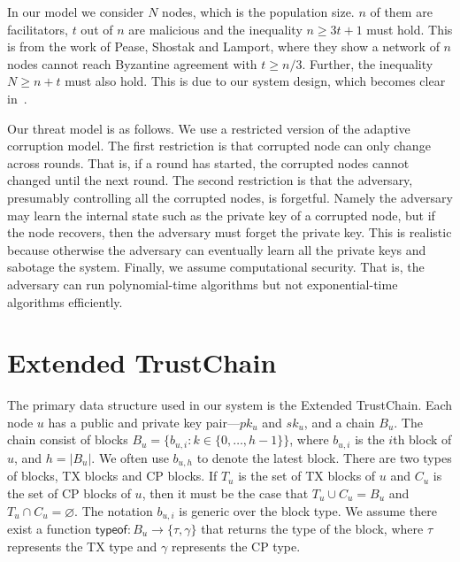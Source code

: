 In our model we consider $N$ nodes, which is the population size.
$n$ of them are facilitators, $t$ out of $n$ are malicious and the inequality
$n \ge 3t + 1$ must hold.
This is from the work of Pease, Shostak and Lamport, where they show a network of $n$ nodes cannot reach Byzantine agreement with $t \ge n/3$.
Further, the inequality $N \ge n + t$ must also hold.
This is due to our system design, which becomes clear in~.

Our threat model is as follows. 
We use a restricted version of the adaptive corruption model.
The first restriction is that corrupted node can only change across rounds.
That is, if a round has started, the corrupted nodes cannot changed until the next round.
The second restriction is that the adversary, presumably controlling all the corrupted nodes, is forgetful.
Namely the adversary may learn the internal state such as the private key of a corrupted node,
but if the node recovers, then the adversary must forget the private key.
This is realistic because otherwise the adversary can eventually learn all the private keys and sabotage the system.
Finally, we assume computational security.
That is, the adversary can run polynomial-time algorithms but not exponential-time algorithms efficiently.

\section{Extended TrustChain}
The primary data structure used in our system is the Extended TrustChain.
Each node $u$ has a public and private key pair---$pk_u$ and $sk_u$, and a chain $B_u$.
The chain consist of blocks $B_u = \{ b_{u, i} : k \in \{ 0, \dots, h - 1 \} \}$,
where $b_{u, i}$ is the $i$th block of $u$,
and $h = |B_u|$.
We often use $b_{u, h}$ to denote the latest block.
There are two types of blocks, TX blocks and CP blocks.
If $T_u$ is the set of TX blocks of $u$ and $C_u$ is the set of CP blocks of $u$,
then it must be the case that $T_u \cup C_u = B_u$ and $T_u \cap C_u = \varnothing$.
The notation $b_{u, i}$ is generic over the block type.
We assume there exist a function $\textsf{typeof}: B_u \rightarrow \{ \tau, \gamma \}$ that returns the type of the block,
where $\tau$ represents the TX type and $\gamma$ represents the CP type.

